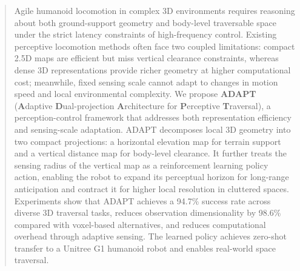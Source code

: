 \begin{abstract}
% 
% 
Agile humanoid locomotion in complex 3D environments requires reasoning about both ground-support geometry and body-level traversable space under the strict latency constraints of high-frequency control. Existing perceptive locomotion methods often face two coupled limitations: compact 2.5D maps are efficient but miss vertical clearance constraints, whereas dense 3D representations provide richer geometry at higher computational cost; meanwhile, fixed sensing scale cannot adapt to changes in motion speed and local environmental complexity. We propose \textbf{ADAPT} (\textbf{A}daptive \textbf{D}ual-projection \textbf{A}rchitecture for \textbf{P}erceptive \textbf{T}raversal), a perception-control framework that addresses both representation efficiency and sensing-scale adaptation. ADAPT decomposes local 3D geometry into two compact projections: a horizontal elevation map for terrain support and a vertical distance map for body-level clearance. It further treats the sensing radius of the vertical map as a reinforcement learning policy action, enabling the robot to expand its perceptual horizon for long-range anticipation and contract it for higher local resolution in cluttered spaces. Experiments show that ADAPT achieves a 94.7\% success rate across diverse 3D traversal tasks, reduces observation dimensionality by 98.6\% compared with voxel-based alternatives, and reduces computational overhead through adaptive sensing. The learned policy achieves zero-shot transfer to a Unitree G1 humanoid robot and enables real-world space traversal.
\end{abstract}